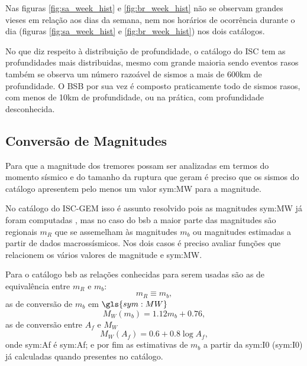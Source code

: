 Nas figuras \ref{fig:sa_week_hist} e \ref{fig:br_week_hist} não se observam grandes vieses em 
relação aos dias da semana, nem nos horários de ocorrência durante o dia 
(figuras \ref{fig:sa_week_hist} e \ref{fig:br_week_hist}) nos dois catálogos.

No que diz respeito à distribuição de profundidade, o catálogo do ISC tem as
profundidades mais distribuidas, mesmo com grande maioria sendo eventos rasos 
também se observa um número razoável de sismos a mais de 600km de profundidade.
O BSB por sua vez é composto praticamente todo de sismos rasos, com menos de 10km
de profundidade, ou na prática, com profundidade desconhecida.



\subsection{Conversão de Magnitudes}
\label{sec:mag_conv}

Para que a magnitude dos tremores possam ser analizadas em termos do momento sísmico e do 
tamanho da ruptura que geram é preciso que os sismos do catálogo apresentem pelo menos um valor
\gls{sym:MW} para a magnitude.

No catálogo do ISC-GEM isso é assunto resolvido pois as magnitudes \gls{sym:MW} já foram computadas \citep{storchak_2013}, mas no
caso do \gls{bsb} a maior parte das magnitudes são regionais $m_R$ que se assemelham às magnitudes $m_b$ 
ou magnitudes estimadas a partir de dados macrossísmicos. Nos dois casos é preciso avaliar funções que relacionem os
vários valores de magnitude e \gls{sym:MW}.

Para o catálogo \gls{bsb} as relações conhecidas para serem
usadas são as de equivalência entre $m_R$ e $m_b$:
\begin{equation}
	\ensuremath{
		m_R \equiv m_b,
	}
\label{eq:mrmb}
\end{equation}
as de conversão de $m_b$ em $\gls{sym:MW}$
\begin{equation}
	\ensuremath{
		M_W(m_b) = 1.12 m_b + 0.76,
	}
\label{eq:mwmb}
\end{equation}
as de conversão entre $A_f$ e $M_W$
\begin{equation}
	\ensuremath{
		M_W(A_f) = 0.6 + 0.8\log A_f,
	}
\label{eq:mwaf}
\end{equation}
onde \gls{sym:Af} é \glsdesc{sym:Af}; e por fim as estimativas de $m_b$ a partir da \glsdesc{sym:I0} (\gls{sym:I0})
já calculadas quando presentes no catálogo.

